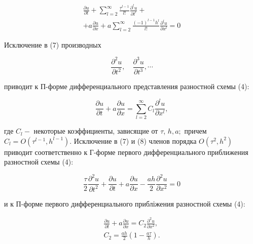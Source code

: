 \documentclass[10pt]{article}
\begin{document}
\[

\begin{gathered}

\frac{\partial u}{\partial t}+\sum_{l=2}^{\infty} \frac{\tau^{l-1}}{l !} \frac{\partial^{l} u}{\partial t^{l}}+ \\

+a \frac{\partial u}{\partial x}+a \sum_{l=2}^{\infty} \frac{(-1)^{l-1} h^{l}}{l !} \frac{\partial^{l} u}{\partial x^{l}}=0

\end{gathered}

\]



Исключение в (7) производных



\[

\frac{\partial^{2} u}{\partial t^{2}}, \quad \frac{\partial^{3} u}{\partial t^{3}}, \cdots

\]



приводит к П-форме дифференциального представления разностной схемы (4):



\[

\frac{\partial u}{\partial t}+a \frac{\partial u}{\partial x}=\sum_{l=2}^{\infty} C_{l} \frac{\partial^{l} u}{\partial x^{l}},

\]



где $C_{l}-$ некоторые коэффициенты, зависящие от $\tau$, $h, a ;$ причем $C_{l}=O\left(\tau^{l-1}, h^{l-1}\right)$. Исключение в (7) и (8) членов порядка $O\left(\tau^{2}, h^{2}\right)$ приводит соответственно к Г-форме первого дифференциального приближения разностной схемы (4):



\[

\frac{\tau}{2} \frac{\partial^{2} u}{\partial t^{2}}+\frac{\partial u}{\partial t}+a \frac{\partial u}{\partial x}-\frac{a h}{2} \frac{\partial^{2} u}{\partial x^{2}}=0

\]



и к П-форме первого дифференциального прибліжения разностной схемы (4):



\[

\begin{gathered}

\frac{\partial u}{\partial t}+a \frac{\partial u}{\partial x}=C_{2} \frac{\partial^{2} u}{\partial x^{2}}, \\

C_{2}=\frac{a h}{2}\left(1-\frac{a \tau}{h}\right) .

\end{gathered}

\]
\end{document}
